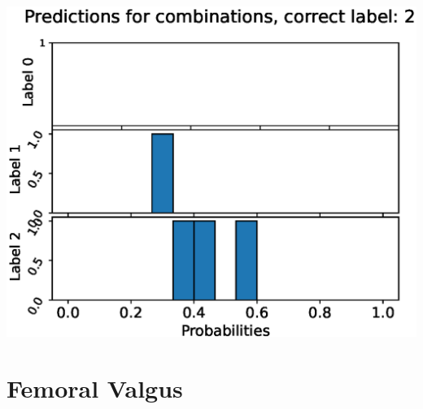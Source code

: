 \begin{center}
\begin{minipage}{0.33\textwidth}
  \includegraphics[width=\textwidth]{files/figs/app/hists/pelvis/pc2.eps}
\end{minipage}
\end{center}

\newpage
\section{Femoral Valgus}

